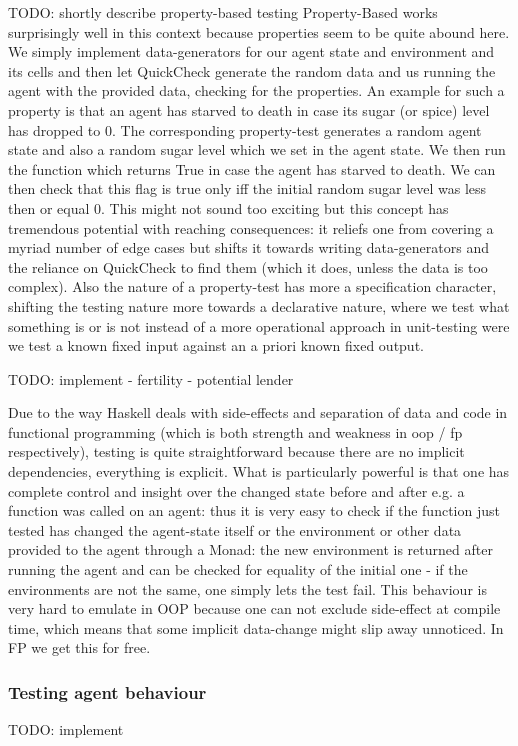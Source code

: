 TODO: shortly describe property-based testing
Property-Based works surprisingly well in this context because properties seem to be quite abound here. We simply implement data-generators for our agent state and environment and its cells and then let QuickCheck generate the random data and us running the agent with the provided data, checking for the properties. An example for such a property is that an agent has starved to death in case its sugar (or spice) level has dropped to 0. The corresponding property-test generates a random agent state and also a random sugar level which we set in the agent state. We then run the function which returns True in case the agent has starved to death. We can then check that this flag is true only iff the initial random sugar level was less then or equal 0. This might not sound too exciting but this concept has tremendous potential with reaching consequences: it reliefs one from covering a myriad number of edge cases but shifts it towards writing data-generators and the reliance on QuickCheck to find them (which it does, unless the data is too complex). Also the nature of a property-test has more a specification character, shifting the testing nature more towards a declarative nature, where we test what something is or is not instead of a more operational approach in unit-testing were we test a known fixed input against an a priori known fixed output.

TODO: implement
- fertility
- potential lender

Due to the way Haskell deals with side-effects and separation of data and code in functional programming (which is both strength and weakness in oop / fp respectively), testing is quite straightforward because there are no implicit dependencies, everything is explicit. What is particularly powerful is that one has complete control and insight over the changed state before and after e.g. a function was called on an agent: thus it is very easy to check if the function just tested has changed the agent-state itself or the environment or other data provided to the agent through a Monad: the new environment is returned after running the agent and can be checked for equality of the initial one - if the environments are not the same, one simply lets the test fail. This behaviour is very hard to emulate in OOP because one can not exclude side-effect at compile time, which means that some implicit data-change might slip away unnoticed. In FP we get this for free.

\subsubsection{Testing agent behaviour}
TODO: implement

